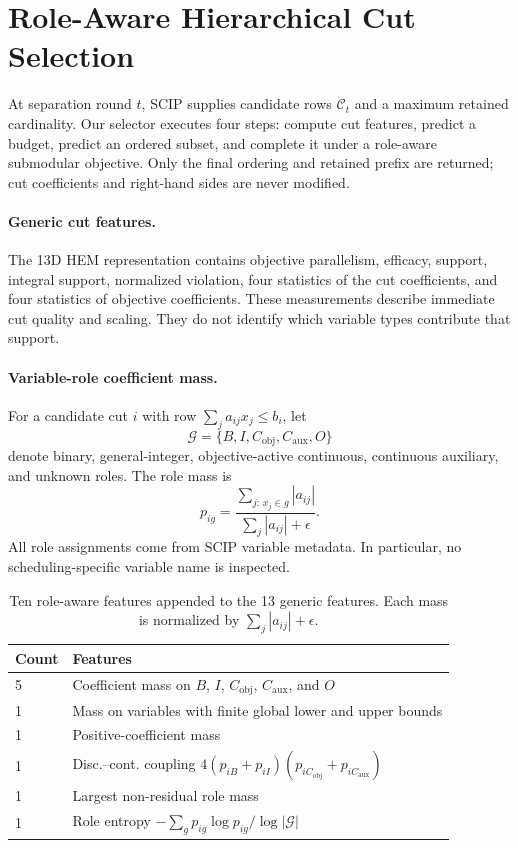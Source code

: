 \documentclass[letterpaper]{article}
\begin{document}
\section{Role-Aware Hierarchical Cut Selection}

At separation round $t$, SCIP supplies candidate rows $\mathcal C_t$ and a maximum retained cardinality.
Our selector executes four steps: compute cut features, predict a budget, predict an ordered subset, and complete it under a role-aware submodular objective.
Only the final ordering and retained prefix are returned; cut coefficients and right-hand sides are never modified.

\paragraph{Generic cut features.}
The 13D HEM representation contains objective parallelism, efficacy, support, integral support, normalized violation, four statistics of the cut coefficients, and four statistics of objective coefficients.
These measurements describe immediate cut quality and scaling.
They do not identify which variable types contribute that support.

\paragraph{Variable-role coefficient mass.}
For a candidate cut $i$ with row $\sum_j a_{ij}x_j\le b_i$, let
\[
\mathcal G=\{B,I,C_{\mathrm{obj}},C_{\mathrm{aux}},O\}
\]
denote binary, general-integer, objective-active continuous, continuous auxiliary, and unknown roles.
The role mass is
\begin{equation}
p_{ig}=\frac{\sum_{j:\,x_j\in g}|a_{ij}|}
{\sum_j|a_{ij}|+\epsilon}.
\label{eq:role_mass}
\end{equation}
All role assignments come from SCIP variable metadata.
In particular, no scheduling-specific variable name is inspected.

\begin{table}[t]
\caption{Ten role-aware features appended to the 13 generic features. Each mass is normalized by $\sum_j|a_{ij}|+\epsilon$.}
\label{tab:features}
\centering
\small
\begin{tabular}{lp{}}
\toprule
Count & Features \\
\midrule
5 & Coefficient mass on $B$, $I$, $C_{\mathrm{obj}}$, $C_{\mathrm{aux}}$, and $O$ \\
1 & Mass on variables with finite global lower and upper bounds \\
1 & Positive-coefficient mass \\
1 & Disc.--cont. coupling $4(p_{iB}+p_{iI})(p_{iC_{\mathrm{obj}}}+p_{iC_{\mathrm{aux}}})$ \\
1 & Largest non-residual role mass \\
1 & Role entropy $-\sum_g p_{ig}\log p_{ig}/\log|\mathcal G|$ \\
\bottomrule
\end{tabular}
\end{table}
\end{document}
